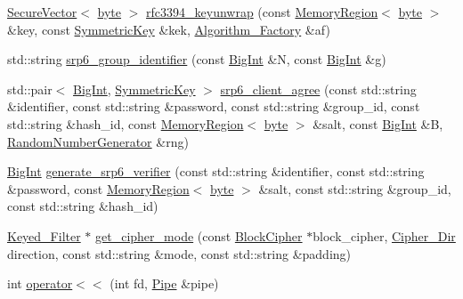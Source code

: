 \begin{DoxyCompactItemize}
\item 
\hyperlink{classBotan_1_1SecureVector}{Secure\-Vector}$<$ \hyperlink{namespaceBotan_a7d793989d801281df48c6b19616b8b84}{byte} $>$ \hyperlink{namespaceBotan_a6e569efdb65d8cf0663b545b63118e21}{rfc3394\-\_\-keyunwrap} (const \hyperlink{classBotan_1_1MemoryRegion}{Memory\-Region}$<$ \hyperlink{namespaceBotan_a7d793989d801281df48c6b19616b8b84}{byte} $>$ \&key, const \hyperlink{namespaceBotan_a00c78597211d5c63b63e2a57ddb96d38}{Symmetric\-Key} \&kek, \hyperlink{classBotan_1_1Algorithm__Factory}{Algorithm\-\_\-\-Factory} \&af)
\item 
std\-::string \hyperlink{namespaceBotan_a9ebc71886dba4b6f02b2c6e529d295ee}{srp6\-\_\-group\-\_\-identifier} (const \hyperlink{classBotan_1_1BigInt}{Big\-Int} \&N, const \hyperlink{classBotan_1_1BigInt}{Big\-Int} \&g)
\item 
std\-::pair$<$ \hyperlink{classBotan_1_1BigInt}{Big\-Int}, \hyperlink{namespaceBotan_a00c78597211d5c63b63e2a57ddb96d38}{Symmetric\-Key} $>$ \hyperlink{namespaceBotan_ab1a462450efd80fc7cc792f4e27180e2}{srp6\-\_\-client\-\_\-agree} (const std\-::string \&identifier, const std\-::string \&password, const std\-::string \&group\-\_\-id, const std\-::string \&hash\-\_\-id, const \hyperlink{classBotan_1_1MemoryRegion}{Memory\-Region}$<$ \hyperlink{namespaceBotan_a7d793989d801281df48c6b19616b8b84}{byte} $>$ \&salt, const \hyperlink{classBotan_1_1BigInt}{Big\-Int} \&B, \hyperlink{classBotan_1_1RandomNumberGenerator}{Random\-Number\-Generator} \&rng)
\item 
\hyperlink{classBotan_1_1BigInt}{Big\-Int} \hyperlink{namespaceBotan_a1720c15f00fcd02dca221450a684cc18}{generate\-\_\-srp6\-\_\-verifier} (const std\-::string \&identifier, const std\-::string \&password, const \hyperlink{classBotan_1_1MemoryRegion}{Memory\-Region}$<$ \hyperlink{namespaceBotan_a7d793989d801281df48c6b19616b8b84}{byte} $>$ \&salt, const std\-::string \&group\-\_\-id, const std\-::string \&hash\-\_\-id)
\item 
\hyperlink{classBotan_1_1Keyed__Filter}{Keyed\-\_\-\-Filter} $\ast$ \hyperlink{namespaceBotan_af29fdf084f45a320de93332ba441ec18}{get\-\_\-cipher\-\_\-mode} (const \hyperlink{classBotan_1_1BlockCipher}{Block\-Cipher} $\ast$block\-\_\-cipher, \hyperlink{namespaceBotan_ad9d14ffdc73fc19966421979b32ee759}{Cipher\-\_\-\-Dir} direction, const std\-::string \&mode, const std\-::string \&padding)
\item 
int \hyperlink{namespaceBotan_ac45692cdbe5d1d3c98fb19a632f04fda}{operator$<$$<$} (int fd, \hyperlink{classBotan_1_1Pipe}{Pipe} \&pipe)

\end{DoxyCompactItemize}
